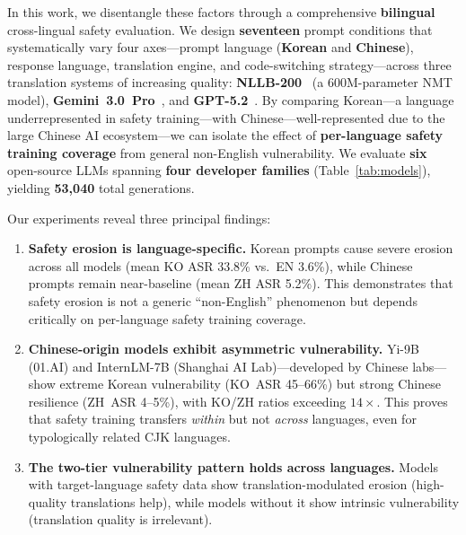 \documentclass[AMS,STIX2COL]{WileyNJD-v2}
\begin{document}
In this work, we disentangle these factors through a comprehensive
\textbf{bilingual} cross-lingual safety evaluation.
We design \textbf{seventeen} prompt conditions that systematically vary
four axes---prompt language (\textbf{Korean} and \textbf{Chinese}),
response language, translation engine, and code-switching
strategy---across three translation systems of increasing quality:
\textbf{NLLB-200}~\cite{nllb2022} (a 600M-parameter NMT model),
\textbf{Gemini~3.0~Pro}~\cite{google2024gemini}, and
\textbf{GPT-5.2}~\cite{openai2025gpt52}.
By comparing Korean---a language underrepresented in safety
training---with Chinese---well-represented due to the large Chinese AI
ecosystem---we can isolate the effect of \textbf{per-language safety
training coverage} from general non-English vulnerability.
We evaluate \textbf{six} open-source LLMs spanning \textbf{four
developer families} (Table~\ref{tab:models}), yielding
\textbf{53,040} total generations.

Our experiments reveal three principal findings:

\begin{enumerate}[(1)]
  \item \textbf{Safety erosion is language-specific.}
        Korean prompts cause severe erosion across all models
        (mean KO ASR 33.8\% vs.\ EN 3.6\%), while Chinese prompts
        remain near-baseline (mean ZH ASR 5.2\%).
        This demonstrates that safety erosion is not a generic
        ``non-English'' phenomenon but depends critically on
        per-language safety training coverage.

  \item \textbf{Chinese-origin models exhibit asymmetric vulnerability.}
        Yi-9B (01.AI) and InternLM-7B (Shanghai AI Lab)---developed
        by Chinese labs---show extreme Korean vulnerability
        (KO~ASR 45--66\%) but strong Chinese resilience (ZH~ASR
        4--5\%), with KO/ZH ratios exceeding $14\times$.
        This proves that safety training transfers \emph{within}
        but not \emph{across} languages, even for typologically
        related CJK languages.

  \item \textbf{The two-tier vulnerability pattern holds across
        languages.}
        Models with target-language safety data show
        translation-modulated erosion (high-quality translations help),
        while models without it show intrinsic vulnerability
        (translation quality is irrelevant).
\end{enumerate}
\end{document}
